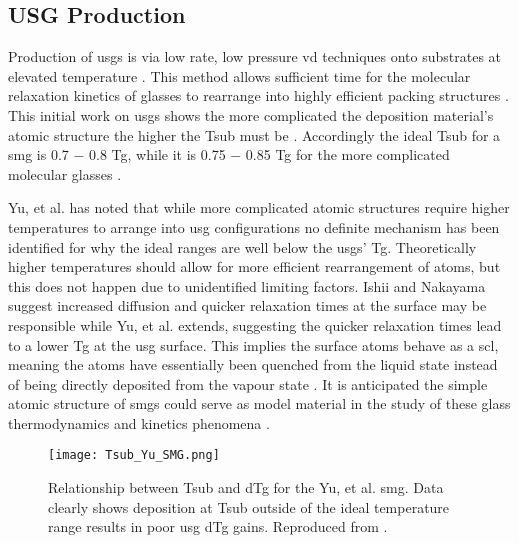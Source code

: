 \documentclass[a4paper,12pt,oneside]{report}%
\begin{document}
\subsection{USG Production}
Production of \glspl{usg} is via low rate, low pressure \gls{vd} techniques onto substrates at elevated temperature \cite{Ishii2014, Aji2013, Yu2013, Wang2014, Nakayama2013}. This method allows sufficient time for the molecular relaxation kinetics of glasses to rearrange into highly efficient packing structures \cite{Aji2013, Swallen2007, Wang2014}. This initial work on \glspl{usg} shows the more complicated the deposition material's atomic structure the higher the \gls{Tsub} must be \cite{Yu2013}. Accordingly the ideal \gls{Tsub} for a \gls{smg} is 0.7 $-$ 0.8 \gls{Tg}, while it is 0.75 $-$ 0.85 \gls{Tg} for the more complicated molecular glasses \cite{Swallen2007, Dawson2011, Yu2013, Dawson2010, Kearns2008}. 
 
Yu, et al. \cite{Yu2013} has noted that while more complicated atomic structures require higher temperatures to arrange into \gls{usg} configurations no definite mechanism has been identified for why the ideal ranges are well below the \glspl{usg}' \gls{Tg}. Theoretically higher temperatures should allow for more efficient rearrangement of atoms, but this does not happen due to unidentified limiting factors. Ishii and Nakayama \cite{Ishii2014} suggest increased diffusion and quicker relaxation times at the surface may be responsible while Yu, et al. \cite{Yu2013} extends, suggesting the quicker relaxation times lead to a lower \gls{Tg} at the \gls{usg} surface. This implies the surface atoms behave as a \gls{scl}, meaning the atoms have essentially been quenched from the liquid state instead of being directly deposited from the vapour state \cite{Yu2013}. It is anticipated the simple atomic structure of \glspl{smg} could serve as model material in the study of these glass thermodynamics and kinetics phenomena \cite{Yu2013, Wang2014}. 

\begin{figure}[htb]
	\centering
	\texttt{[image: Tsub\_Yu\_SMG.png]}
	\caption[Relationship between \acrshort{Tsub} and \acrshort{dTg} for the Yu, et al. \acrshort{smg}. Data clearly shows deposition at \acrshort{Tsub} outside of the ideal temperature range results in poor \acrshort{usg} \acrshort{dTg} gains.]{Relationship between \acrshort{Tsub} and \acrshort{dTg} for the Yu, et al. \cite{Yu2013} \acrshort{smg}. Data clearly shows deposition at \acrshort{Tsub} outside of the ideal temperature range results in poor \acrshort{usg} \acrshort{dTg} gains. Reproduced from \cite{Yu2013}.}
	\label{fig:YuTsub}
\end{figure}
\end{document}
